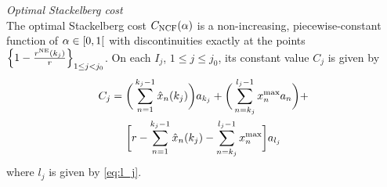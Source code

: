 \begin{theorem}{\emph{Optimal Stackelberg cost}\\}
\label{thm:cost}
The optimal Stackelberg cost $C_{\textup{NCF}}(\alpha)$ is a non-increasing, piecewise-constant function of $\alpha \in [0,1[$ with discontinuities exactly at the points $\left\{ 1- \frac{r^{\textup{NE}} ( k_{j} )}{r} \right\}_{1 \leq j < j_0}$. On each $I_j$, ${ 1 \leq j \leq j_0 }$, its constant value $C_j$ is given by
\begin{multline}
C_j = 
\bigg( \sum_{n = 1}^{k_j - 1} \hat{x}_{n} ( k_j ) \bigg) a_{k_j} + 
\bigg( \sum_{n = k_j}^{l_j - 1} x^{\max}_n  a_n \bigg)+ \\
\bigg[r - \sum_{n = 1}^{k_j - 1} \hat{x}_{n} ( k_j ) - \sum_{n = k_j}^{l_j-1}{x^{\max}_n} \bigg] a_{l_j}
\end{multline}
where $l_j$ is given by \eqref{eq:l_j}.
\end{theorem}

